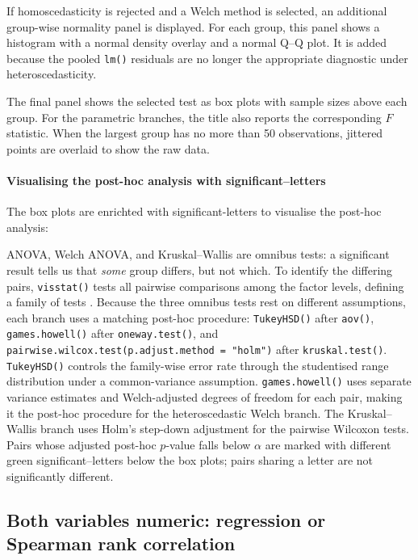 If homoscedasticity is rejected and a Welch method is selected, an
additional group-wise normality panel is displayed. For each group, this
panel shows a histogram with a normal density overlay and a normal Q--Q
plot. It is added because the pooled \texttt{lm()} residuals are no longer the
appropriate diagnostic under heteroscedasticity.

The final panel shows the selected test as box plots with sample sizes
above each group. For the parametric branches, the title also reports
the corresponding \(F\) statistic. When the largest group has no more than
50 observations, jittered points are overlaid to show the raw data.

\paragraph{Visualising the post-hoc analysis with significant--letters}\label{visualising-the-post-hoc-analysis-with-significantletters}

The box plots are enrichted with significant-letters to visualise the post-hoc analysis:

ANOVA, Welch ANOVA, and Kruskal--Wallis are omnibus tests: a significant
result tells us that \emph{some} group differs, but not which. To identify
the differing pairs, \texttt{visstat()} tests all pairwise comparisons among
the factor levels, defining a family of tests \citep{Abdi:2007}. Because the
three omnibus tests rest on different assumptions, each branch uses a
matching post-hoc procedure: \texttt{TukeyHSD()} after \texttt{aov()},
\texttt{games.howell()} after \texttt{oneway.test()}, and
\texttt{pairwise.wilcox.test(p.adjust.method\ =\ "holm")} after \texttt{kruskal.test()}.
\texttt{TukeyHSD()} controls the family-wise error rate through the studentised
range distribution under a common-variance assumption. \texttt{games.howell()}
uses separate variance estimates and Welch-adjusted degrees of freedom
for each pair, making it the post-hoc procedure for the heteroscedastic
Welch branch. The Kruskal--Wallis branch uses Holm's step-down
adjustment for the pairwise Wilcoxon tests. Pairs whose adjusted
post-hoc \(p\)-value falls below \(\alpha\) are marked with different green
significant--letters below the box plots; pairs sharing a letter are not
significantly different.

\subsection{Both variables numeric: regression or Spearman rank correlation}\label{both-variables-numeric-regression-or-spearman-rank-correlation}

